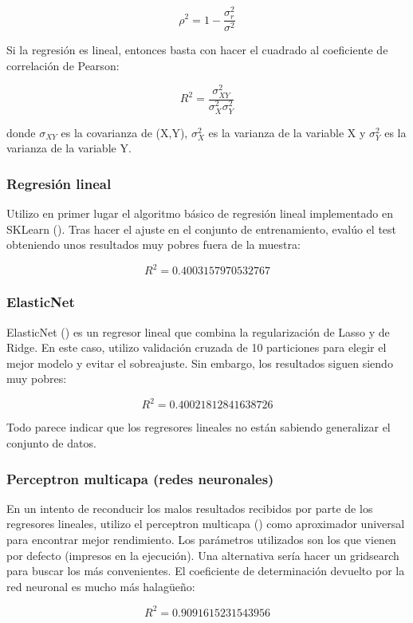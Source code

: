 $$ \rho^2 = 1 - \frac{\sigma^2_r}{\sigma^2}$$

Si la regresión es lineal, entonces basta con hacer el cuadrado al coeficiente de correlación de Pearson:

$$R^2 = \frac{\sigma^2_{XY}}{\sigma^2_X \sigma^2_Y}$$

donde $\sigma_{XY}$ es la covarianza de (X,Y), $\sigma^2_X$ es la varianza de la variable X y $\sigma^2_Y$ es la varianza de la variable Y.

\subsubsection{Regresión lineal}

Utilizo en primer lugar el algoritmo básico de regresión lineal implementado en SKLearn (\cite{reg-l}). Tras hacer el ajuste en el conjunto de entrenamiento, evalúo el test obteniendo unos resultados muy pobres fuera de la muestra:

$$R^2 = 0.4003157970532767$$

\subsubsection{ElasticNet}

ElasticNet (\cite{elastic}) es un regresor lineal que combina la regularización de Lasso y de Ridge. En este caso, utilizo validación cruzada de 10 particiones para elegir el mejor modelo y evitar el sobreajuste. Sin embargo, los resultados siguen siendo muy pobres:

$$R^2 = 0.40021812841638726$$

Todo parece indicar que los regresores lineales no están sabiendo generalizar el conjunto de datos.

\subsubsection{Perceptron multicapa (redes neuronales)}

En un intento de reconducir los malos resultados recibidos por parte de los regresores lineales, utilizo el perceptron multicapa (\cite{mlp}) como aproximador universal para encontrar mejor rendimiento. Los parámetros utilizados son los que vienen por defecto (impresos en la ejecución). Una alternativa sería hacer un gridsearch para buscar los más convenientes. El coeficiente de determinación devuelto por la red neuronal es mucho más halagüeño:

$$R^2 = 0.9091615231543956$$

